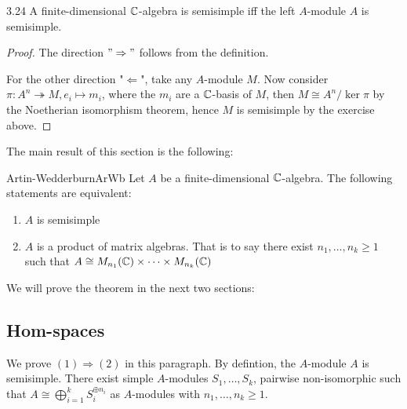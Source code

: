 \documentclass[twoside = false,	%
		headsepline,		%
		parskip = true,
		]{scrbook}						%
\begin{document}
    \begin{proposition}{}{3.24}
        A finite-dimensional $\mathbb C$-algebra is semisimple iff the left $A$-module $A$ is semisimple.
    \end{proposition}

    \begin{proof}
        The direction $"\Rightarrow"$ follows from the definition.

        For the other direction "$\Leftarrow$", take any $A$-module $M$. Now consider $\pi: A^n \twoheadrightarrow M, e_i \mapsto m_i$, where the $m_i$ are a $\mathbb C$-basis of $M$, then $M \cong A^{n}/\ker \pi$ by the Noetherian isomorphism theorem, hence $M$ is semisimple by the exercise above.
    \end{proof}

    The main result of this section is the following:

    \begin{theorem}{Artin-Wedderburn}{ArWb}
        Let $A$ be a finite-dimensional $\mathbb C$-algebra. The following statements are equivalent:
        \begin{enumerate}
            \item $A$ is semisimple
            \item $A$ is a product of matrix algebras. That is to say there exist $n_1,\dots,n_k \geq 1$ such that $A \cong M_{n_1}(\mathbb C) \times \dots \times M_{n_k}(\mathbb C)$
        \end{enumerate}
    \end{theorem}

    We will prove the theorem in the next two sections:
    
    \subsection{Hom-spaces}
        We prove $(1) \Rightarrow (2)$ in this paragraph. By defintion, the $A$-module $A$ is semisimple. There exist simple $A$-modules $S_1,\dots,S_k$, pairwise non-isomorphic such that $A \cong \bigoplus\limits_{i=1}^k S_i^{\oplus n_i}$ as $A$-modules with $n_1,\dots,n_k \geq 1$.
\end{document}
